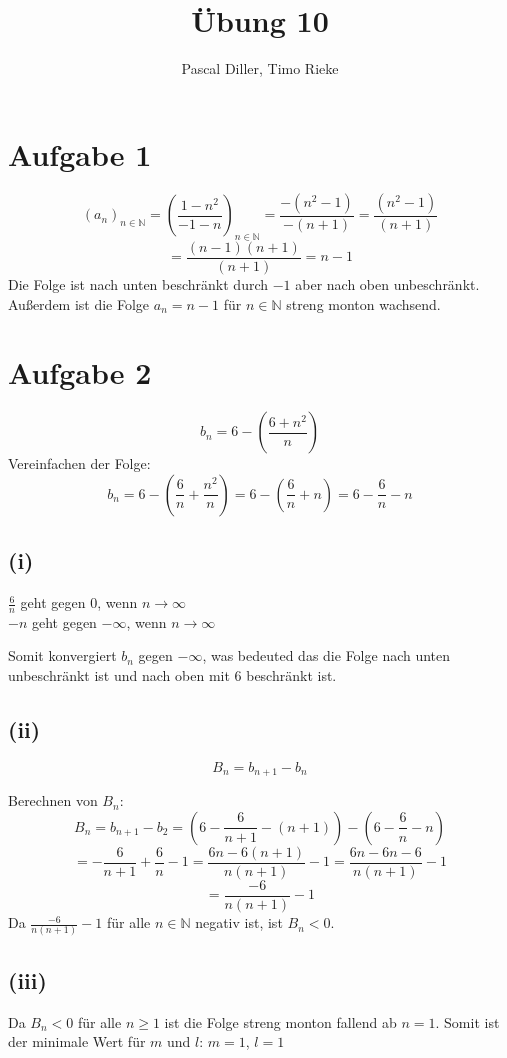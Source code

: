 \documentclass{article}
\title{Übung 10}
\author{Pascal Diller, Timo Rieke}
\begin{document}
\maketitle

\section{Aufgabe 1}
\[(a_n)_{n\in \mathbb{N}}=(\frac{1-n^2}{-1-n})_{n \in \mathbb{N}} = \frac{-(n^2-1)}{-(n+1)}= \frac{(n^2-1)}{(n+1)}\]
\[= \frac{(n-1)(n+1)}{(n+1)} = n-1\]
Die Folge ist nach unten beschränkt durch $-1$ aber nach oben unbeschränkt.
Außerdem ist die Folge $a_n = n-1$ für $n \in \mathbb{N}$ streng monton wachsend.

\section{Aufgabe 2}
\[b_n = 6-(\frac{6+n^2}{n})\]
Vereinfachen der Folge:
\[b_n = 6-(\frac{6}{n}+\frac{n^2}{n}) = 6- (\frac{6}{n}+n) = 6-\frac{6}{n}-n\]

\subsection{(i)}
\begin{center}
    $\frac{6}{n}$ geht gegen 0, wenn $n \xrightarrow{} \infty$ \\
    $-n$ geht gegen $-\infty$, wenn $n \xrightarrow{} \infty$ 
\end{center}
Somit konvergiert $b_n$ gegen $-\infty$, was bedeuted das die Folge nach unten unbeschränkt ist und nach oben mit 6 beschränkt ist.

\subsection{(ii)}
\[B_n= b_{n+1}-b_n\]

Berechnen von $B_n$:
\[B_n = b_{n+1}-b_2 = (6-\frac{6}{n+1}-(n+1))-(6-\frac{6}{n}-n)\]
\[= -\frac{6}{n+1}+\frac{6}{n}-1 = \frac{6n-6(n+1)}{n(n+1)}-1= \frac{6n-6n-6}{n(n+1)}-1\]
\[=\frac{-6}{n(n+1)}-1\]
Da $\frac{-6}{n(n+1)}-1$ für alle $n \in \mathbb{N}$ negativ ist, ist $B_n<0$.

\subsection{(iii)}
Da $B_n <0$ für alle $n \geq 1$ ist die Folge streng monton fallend ab $n=1$.
Somit ist der minimale Wert für $m$ und $l$: $m=1$, $l=1$
\end{document}
